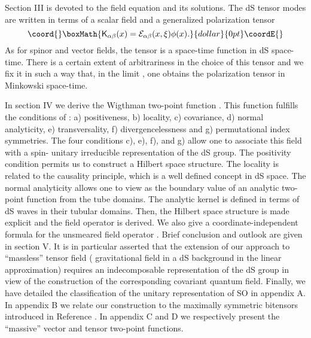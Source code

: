 \documentclass[a4paper,11pt,showpacs,preprintnumbers]{revtex4}
\def\K{\textsf{K}}
\begin{document}
Section III is devoted to the field equation and its solutions.
The dS tensor modes are written in terms of a scalar field \myHighlight{$\phi$}\coordHE{}
and a generalized polarization tensor \coordHE{}  $$\coord{}\boxMath{ \K_{\alpha
\beta} (x)= {\cal E}_{\alpha \beta}(x,\xi)\phi (x). }{dollar}{0pt}\coordE{}$$ As for
spinor and vector fields,  the tensor \coordHE{} is a
space-time function in dS space-time. There is a certain extent of
arbitrariness in the choice of this tensor  and we fix it in such
a way that, in the limit \coordHE{}, one obtains the polarization
tensor in Minkowski space-time.

In section IV we derive the Wigthman two-point function \coordHE{}. This function fulfills the
conditions of : a) positiveness, b) locality, c) covariance, d)
normal analyticity, e) transversality, f) divergencelessness and
g) permutational index symmetries. The four conditions c), e), f),
and g) allow one to associate this field with a spin-\coordHE{} unitary
irreducible representation of the dS group. The positivity
condition permits us to construct a Hilbert space structure. The
locality is related to the causality principle, which is a well
defined concept in dS space. The normal analyticity allows one to
view \coordHE{} as the boundary
value of an analytic two-point function \coordHE{} from the tube domains. The analytic kernel
\coordHE{} is defined in terms of dS
waves in their tubular domains. Then, the Hilbert space structure
is made explicit and the field operator \coordHE{} is derived.
We also give a coordinate-independent formula for the unsmeared
field operator \coordHE{}. Brief conclusion and outlook are
given in section V. It is in particular asserted that the
extension of our approach to ``massless'' tensor field (
gravitational field in a dS background in the linear
approximation) requires an indecomposable representation of the dS
group in view of the construction of the corresponding covariant
quantum field. Finally, we have detailed the classification of the
unitary representation of SO\coordHE{} in appendix A. In appendix
B we relate our construction to the maximally symmetric bitensors
introduced in Reference \cite{allen}. In appendix C and D we
respectively present the ``massive'' vector and tensor two-point
functions.
\end{document}
